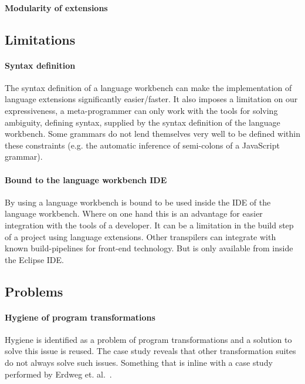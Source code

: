 \paragraph{Modularity of extensions}

\subsection{Limitations}

\paragraph{Syntax definition}
The syntax definition of a language workbench can make the implementation of language extensions significantly easier/faster. It also imposes a limitation on our expressiveness, a meta-programmer can only work with the tools for solving ambiguity, defining syntax, supplied by the syntax definition of the language workbench. Some grammars do not lend themselves very well to be defined within these constraints (e.g. the automatic inference of semi-colons of a JavaScript grammar).

\paragraph{Bound to the language workbench IDE}
By using a language workbench \projectname is bound to be used inside the IDE of the language workbench. Where on one hand this is an advantage for easier integration with the tools of a developer. It can be a limitation in the build step of a project using language extensions. Other transpilers can integrate with known build-pipelines for front-end technology. But \projectname is only available from inside the Eclipse IDE. 

\subsection{Problems}

\paragraph{Hygiene of program transformations}
Hygiene is identified as a problem of program transformations and a solution to solve this issue is reused. The case study reveals that other transformation suites do not always solve such issues. Something that is inline with a case study performed by Erdweg et. al.~\cite{Erdweg2014a}.
